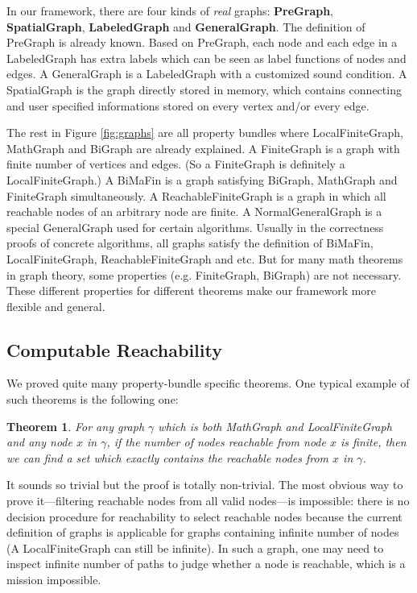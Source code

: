 In our framework, there are four kinds of \emph{real}
graphs: \textbf{PreGraph}, \textbf{SpatialGraph}, \textbf{LabeledGraph}
and \textbf{GeneralGraph}. The definition of PreGraph is already
known. Based on PreGraph, each node and each edge in a LabeledGraph
has extra labels which can be seen as label functions of nodes and
edges. A GeneralGraph is a LabeledGraph with a customized sound
condition. A SpatialGraph is the graph directly stored in memory,
which contains connecting and user specified informations stored on
every vertex and/or every edge.

The rest in Figure \ref{fig:graphs} are all property bundles where
LocalFiniteGraph, MathGraph and BiGraph are already explained. A
FiniteGraph is a graph with finite number of vertices and edges. (So a
FiniteGraph is definitely a LocalFiniteGraph.) A BiMaFin is a graph
satisfying BiGraph, MathGraph and FiniteGraph simultaneously. A
ReachableFiniteGraph is a graph in which all reachable nodes of an
arbitrary node are finite. A NormalGeneralGraph is a special
GeneralGraph used for certain algorithms. Usually in the correctness
proofs of concrete algorithms, all graphs satisfy the definition of
BiMaFin, LocalFiniteGraph, ReachableFiniteGraph and etc. But for many
math theorems in graph theory, some properties (e.g. FiniteGraph,
BiGraph) are not necessary. These different properties for different
theorems make our framework more flexible and general.

\subsection{Computable Reachability}
We proved quite many property-bundle specific theorems. One typical
example of such theorems is the following one:
\newtheorem{mythm}{Theorem}
\begin{mythm}
For any graph $\gamma$ which is both MathGraph and LocalFiniteGraph
and any node $x$ in $\gamma$, if the number of nodes reachable from
node $x$ is finite, then we can find a set which exactly contains the
reachable nodes from $x$ in $\gamma$.
\end{mythm}
It sounds so trivial but the proof is totally non-trivial. The most
obvious way to prove it---filtering reachable nodes from all valid
nodes---is impossible: there is no decision procedure for reachability
to select reachable nodes because the current definition of graphs is
applicable for graphs containing infinite number of nodes (A
LocalFiniteGraph can still be infinite). In such a graph, one may need
to inspect infinite number of paths to judge whether a node is
reachable, which is a mission impossible.

